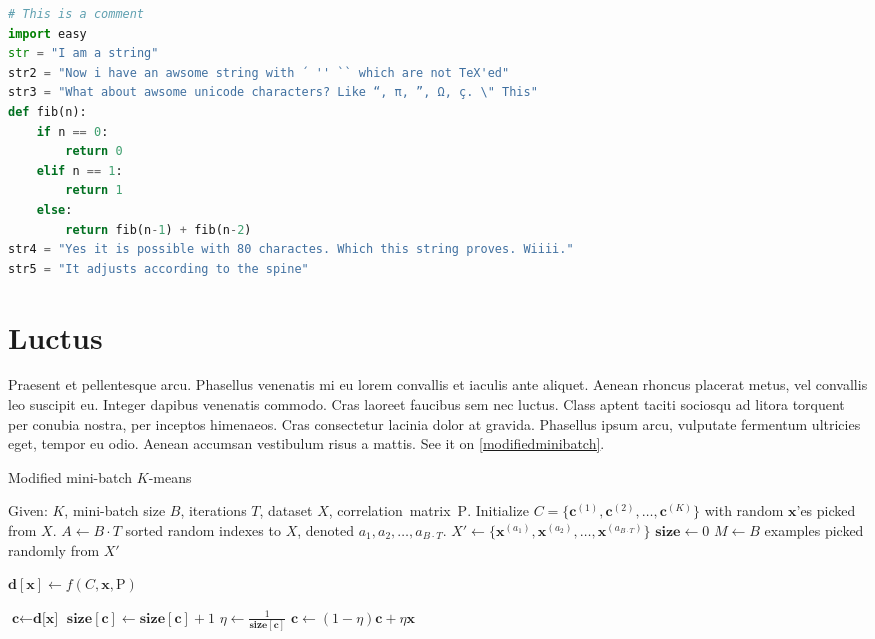 \begin{adjustwidth*}{0cm}{-0.4cm}
\begin{lstlisting}[language=Python,caption=Fibonacci,label=fibonacci]
# This is a comment
import easy
str = "I am a string"
str2 = "Now i have an awsome string with ´ '' `` which are not TeX'ed"
str3 = "What about awsome unicode characters? Like “, π, ”, Ω, ç. \" This"
def fib(n):
    if n == 0:
        return 0
    elif n == 1:
        return 1
    else:
        return fib(n-1) + fib(n-2)
str4 = "Yes it is possible with 80 charactes. Which this string proves. Wiiii."
str5 = "It adjusts according to the spine"
\end{lstlisting}
\end{adjustwidth*}

\section{Luctus}
Praesent et pellentesque arcu. Phasellus venenatis mi eu lorem convallis et iaculis ante aliquet. Aenean rhoncus placerat metus, vel convallis leo suscipit eu. Integer dapibus venenatis commodo. Cras laoreet faucibus sem nec luctus. Class aptent taciti sociosqu ad litora torquent per conubia nostra, per inceptos himenaeos. Cras consectetur lacinia dolor at gravida. Phasellus ipsum arcu, vulputate fermentum ultricies eget, tempor eu odio. Aenean accumsan vestibulum risus a mattis. See it on \cref{modifiedminibatch}.

\begin{algorithm}
\caption{Modified mini-batch $K$-means} \label{modifiedminibatch}
\begin{algorithmic}[1]
\State Given: $K$, mini-batch size $B$, iterations $T$, dataset $X$, correlation~matrix~$\mathrm{P}$.
\State Initialize $C = \{\mathbf{c}^{(1)}, \mathbf{c}^{(2)}, \ldots, \mathbf{c}^{(K)}\}$ with random $\mathbf{x}$'es picked from $X$.
\State $A \gets B \cdot T$ sorted random indexes to $X$, denoted $a_1, a_2, \ldots, a_{B\cdot T}$.
\State $X' \gets \{\mathbf{x}^{(a_1)}, \mathbf{x}^{(a_2)}, \ldots, \mathbf{x}^{(a_{B\cdot T})}\}$ 
\State $\textbf{size} \gets 0$
    \State $M \gets B$ examples picked randomly from $X'$
    
     
        \State $\textbf{d}[\textbf{x}] \gets f(C,\mathbf{x}, \mathrm{P})$ 
    \EndFor
    
     
        \State $\textbf{c} \gets \textbf{d[x]}$ 
        \State $\textbf{size}[\textbf{c}] \gets \textbf{size}[\textbf{c}] + 1$ 
        \State $\eta \gets \frac{1}{\textbf{size}[\textbf{c}]}$       
        \State $\textbf{c} \gets (1 - \eta)\textbf{c}+\eta\textbf{x}$ 
    \EndFor
\EndFor
\State {}
\end{algorithmic}
\end{algorithm}

